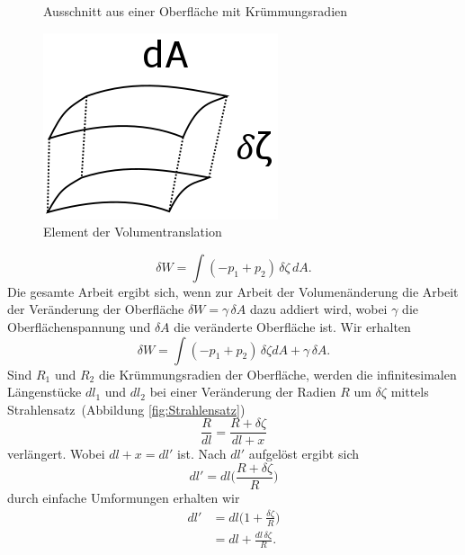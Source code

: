 \begin{refsection}
\begin{figure}
  \caption{Ausschnitt aus einer Oberfläche mit Krümmungsradien} 
  \label{fig:YoungCone}
\end{figure}
\begin{figure}
  \centering
  \includegraphics[scale=0.3]{minimal/Volumetranslation.png}
  \caption{Element der Volumentranslation} 
  \label{fig:Volumentransaltion}
\end{figure}
\begin{equation}
\delta W=\int(-p_1+p_2)\,\delta\zeta\,dA.
\end{equation}
Die gesamte Arbeit ergibt sich, wenn zur Arbeit der Volumenänderung die Arbeit der Veränderung der Oberfläche $\delta W=\gamma \, \delta A $ dazu addiert wird, wobei $\gamma$ die Oberflächenspannung und $\delta A$ die veränderte Oberfläche ist. Wir erhalten
\begin{equation}\label{YL-Arbeit_1}
\delta W=\int(-p_1+p_2)\,\delta\zeta dA + \gamma \,\delta A.
\end{equation}
Sind $R_1$ und $R_2$ die Krümmungsradien der Oberfläche, werden die infinitesimalen Längenstücke $dl_1$ und $dl_2$ bei einer Veränderung der Radien $R$ um $\delta\zeta$ mittels Strahlensatz \,(Abbildung \ref{fig:Strahlensatz})
\begin{equation}
\frac{R}{dl}=\frac{R+\delta\zeta}{dl+x}
\end{equation}
verlängert. Wobei $dl+x=dl'$ ist. Nach $dl'$ aufgelöst ergibt sich
\begin{equation}
dl' = dl\bigg(\frac{R+\delta\zeta}{R}\bigg)
\end{equation}
durch einfache Umformungen erhalten wir
\begin{equation}
\begin{split}
dl' &= dl\bigg(1+\frac{\delta\zeta}{R}\bigg)\\
&=dl+\frac{dl\,\delta\zeta}{R} .
\end{split} 
\end{equation}
\begin{figure}
  \centering

\end{figure}
\end{refsection}
